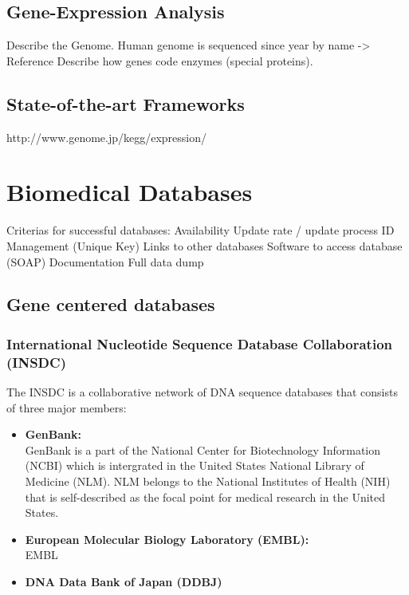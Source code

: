 \subsection{Gene-Expression Analysis}

Describe the Genome.
Human genome is sequenced since year by name -> Reference 
Describe how genes code enzymes (special proteins).
\subsection{State-of-the-art Frameworks}

http://www.genome.jp/kegg/expression/


\section{Biomedical Databases}

Criterias for successful databases: 
Availability
Update rate / update process
ID Management (Unique Key)
Links to other databases
Software to access database (SOAP)
Documentation
Full data dump

\subsection{Gene centered databases}

\subsubsection{International Nucleotide Sequence Database Collaboration (INSDC)}

The INSDC is a collaborative network of DNA sequence databases that consists of three major members:
\begin{itemize}
 \item \textbf{GenBank:} \\
 GenBank is a part of the National Center for Biotechnology Information (NCBI) which is intergrated in the United States National Library of Medicine (NLM). NLM belongs to the National Institutes of Health (NIH) that is self-described as the focal point for medical research in the United States.
 \item \textbf{European Molecular Biology Laboratory (EMBL):} \\
 EMBL
 \item \textbf{DNA Data Bank of Japan (DDBJ)} \\
\end{itemize}

